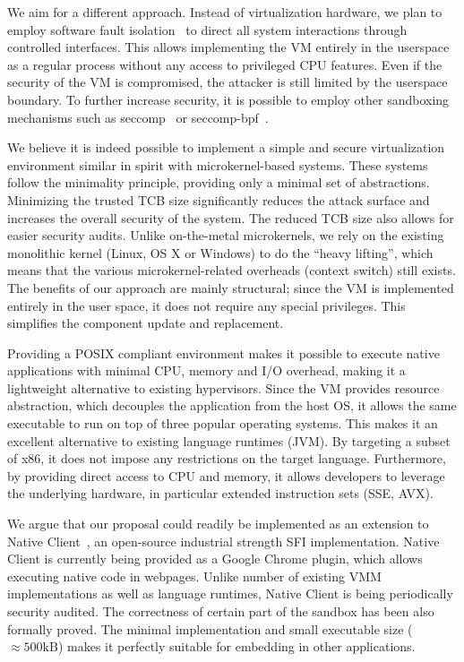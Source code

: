 We aim for a different approach. Instead of virtualization hardware, we
plan to employ software fault isolation~\cite{wahbe:sosp93} to direct
all system interactions through controlled interfaces. This allows
implementing the VM entirely in the userspace as a regular process
without any access to privileged CPU features. Even if the security of
the VM is compromised, the attacker is still limited by the userspace
boundary. To further increase security, it is possible to employ other
sandboxing mechanisms such as seccomp~\cite{seccomp} or
seccomp-bpf~\cite{seccomp-bpf}.

We believe it is indeed possible to implement a simple and secure
virtualization environment similar in spirit with microkernel-based
systems. These systems follow the minimality principle, providing only a
minimal set of abstractions. Minimizing the trusted TCB size
significantly reduces the attack surface and increases the overall
security of the system. The reduced TCB size also allows for easier
security audits. Unlike on-the-metal microkernels, we rely on the
existing monolithic kernel (\ie Linux, OS X or Windows) to do the
``heavy lifting'', which means that the various microkernel-related
overheads (\eg context switch) still exists. The benefits of our
approach are mainly structural; since the VM is implemented entirely in
the user space, it does not require any special privileges. This
simplifies the component update and replacement.

Providing a POSIX compliant environment makes it possible to execute
native applications with minimal CPU, memory and I/O overhead,
making it a lightweight alternative to existing hypervisors.  Since the
VM provides resource abstraction, which decouples the application from the
host OS, it allows the same executable to run on top of three popular
operating systems. This makes it an excellent alternative to existing
language runtimes (\eg JVM). By targeting a subset of x86, it does not
impose any restrictions on the target language.  Furthermore, by
providing direct access to CPU and memory, it allows developers to
leverage the underlying hardware, in particular extended instruction
sets (\eg SSE, AVX).


We argue that our proposal could readily be implemented as an extension
to Native Client~\cite{yee:ieee-sp09}, an open-source industrial
strength SFI implementation. Native Client is currently being provided
as a Google Chrome plugin, which allows executing native code in
webpages. Unlike number of existing VMM implementations as well as
language runtimes, Native Client is being periodically security audited.
The correctness of certain part of the sandbox has been also formally
proved. The minimal implementation and small executable size
($\approx500\mathrm{kB}$) makes it perfectly suitable for
embedding in other applications.

